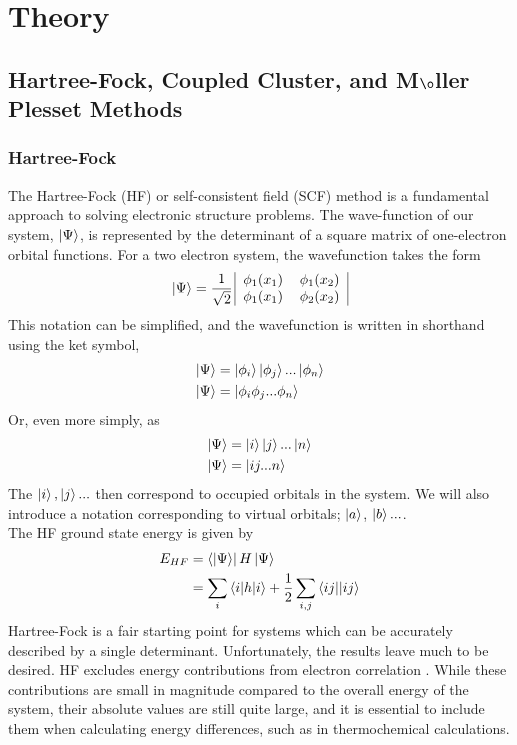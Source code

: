 \documentclass[letterpaper, 12pt, titlepage]{article}
\begin{document}
\section{Theory}

\subsection{Hartree-Fock, Coupled Cluster, and M$\o$ller Plesset Methods}
\subsubsection{Hartree-Fock}
The Hartree-Fock (HF) or self-consistent field (SCF) method is a fundamental approach to solving electronic structure problems. The wave-function of our system, $\ket{\Psi}$, is represented by the determinant of a square matrix of one-electron orbital functions. For a two electron system, the wavefunction takes the form
\begin{align*}
\ket{\Psi}&= \frac{1}{\sqrt{2}} \,
\begin{tabular}{|c c|}
$\phi_1(x_1)$ &$\phi_1(x_2)$\\
$\phi_1(x_1)$&$\phi_2(x_2)$
\end{tabular}\\
\end{align*}
This notation can be simplified, and the wavefunction is written in shorthand using the ket symbol,
\begin{align*}
\ket{\Psi} &= \ket{\phi_i} \ket{\phi_j} ...\ket{\phi_n}\\
\ket{\Psi} &= \ket{\phi_i \phi_j ...\phi_n} \\
\end{align*}
Or, even more simply, as
\begin{align*}
\ket{\Psi} &= \ket{i} \ket{j} ...\ket{n}\\
\ket{\Psi} &= \ket{ij...n}
\end{align*}
The $\ket{i}, \ket{j} ...$ then correspond to occupied orbitals in the system. We will also introduce a notation corresponding to virtual orbitals;  $\ket{a}$, $\ket{b}...$. \\

The HF ground state energy is given by
\begin{align*}
E_{HF}&=\Bra{\ket{\Psi}}H\ket{\Psi}\\
&=\sum\limits_i \braket{i|h|i} + \frac{1}{2} \sum\limits_{i,j} \braket{ij||ij}
\end{align*}
Hartree-Fock is a fair starting point for systems which can be accurately described by a single determinant. Unfortunately, the results leave much to be desired. HF excludes energy contributions from electron correlation \cite{SO}. While these contributions are small in magnitude compared to the overall energy of the system, their absolute values are still quite large, and it is essential to include them when calculating energy differences, such as in thermochemical calculations. 
\end{document}

